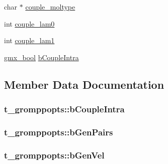 \begin{DoxyCompactItemize}
\item 
char $\ast$ \hyperlink{structt__gromppopts_aa285f3bbc30f726c2c9fa170039b9cf8}{couple\-\_\-moltype}
\item 
int \hyperlink{structt__gromppopts_a0ee9cb24f2435d8a42ee9a8dc9dc454e}{couple\-\_\-lam0}
\item 
int \hyperlink{structt__gromppopts_a7c1ee8e5f93b09d28f91cb257c773200}{couple\-\_\-lam1}
\item 
\hyperlink{include_2types_2simple_8h_a8fddad319f226e856400d190198d5151}{gmx\-\_\-bool} \hyperlink{structt__gromppopts_a1f96e066b669f44f301d6d553f8dcb86}{b\-Couple\-Intra}
\end{DoxyCompactItemize}


\subsection{\-Member \-Data \-Documentation}
\hypertarget{structt__gromppopts_a1f96e066b669f44f301d6d553f8dcb86}{
\subsubsection[{b\-Couple\-Intra}]{ {\bf t\-\_\-gromppopts\-::b\-Couple\-Intra}}}\label{structt__gromppopts_a1f96e066b669f44f301d6d553f8dcb86}
\hypertarget{structt__gromppopts_ac760b721b0dc4fc9f90ad34e8ff05552}{
\subsubsection[{b\-Gen\-Pairs}]{ {\bf t\-\_\-gromppopts\-::b\-Gen\-Pairs}}}\label{structt__gromppopts_ac760b721b0dc4fc9f90ad34e8ff05552}
\hypertarget{structt__gromppopts_a2a7e88745fc30ae9659b267cbe88e08e}{
\subsubsection[{b\-Gen\-Vel}]{ {\bf t\-\_\-gromppopts\-::b\-Gen\-Vel}}}\label{structt__gromppopts_a2a7e88745fc30ae9659b267cbe88e08e}
